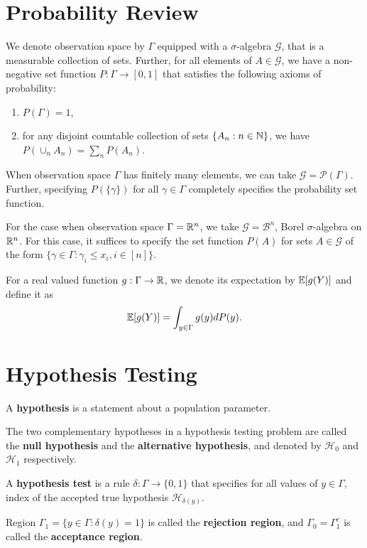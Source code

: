 \documentclass[a4paper,english,12pt]{article}
\begin{document}
\section{Probability Review}
We denote observation space by $\Gamma$ equipped with a $\sigma$-algebra $\mathcal{G}$, that is a  measurable collection of sets.
Further, for all elements of $A \in \mathcal{G}$, we have a non-negative set function $P: \Gamma \to [0,1]$ that satisfies the following axioms of probability:
\begin{enumerate}
\item $P(\Gamma) = 1$,
\item for any disjoint countable collection of sets $\{A_n: n \in \mathbb{N}\}$, we have $P(\cup_nA_n) = \sum_n P(A_n)$.
\end{enumerate}
\begin{exmp} When observation space $\Gamma$ has finitely many elements, we can take $\mathcal{G} = \mathcal{P}(\Gamma)$. 
Further, specifying $P(\{\gamma\})$ for all $\gamma \in \Gamma$ completely specifies the probability set function.
\end{exmp}
\begin{exmp} For the case when observation space $\Gamma = \mathbb{R}^n$, we take $\mathcal{G} = \mathcal{B}^n$, Borel $\sigma$-algebra on $\mathbb{R}^n$. 
For this case, it suffices to specify the set function $P(A)$ for  sets $A \in \mathcal{G}$ of the form $\{\gamma \in \Gamma: \gamma_i \leq x_i, i \in [n]\}$.
\end{exmp}
\begin{defn}[Expectation] For a real valued function $g: \Gamma \to \mathbb{R}$, we denote its expectation by $\mathbb{E}[g(Y)]$ and define it as
\begin{align*}
\mathbb{E}[g(Y)] = \int_{y \in \Gamma}g(y)dP(y).
\end{align*}
\end{defn}

\section{Hypothesis Testing}
\begin{defn} A \textbf{hypothesis} is a statement about a population parameter.
\end{defn}
\begin{defn} The two complementary hypotheses in a hypothesis testing problem are called the \textbf{null hypothesis} and the \textbf{alternative hypothesis}, and denoted by $\mathcal{H}_0$ and $\mathcal{H}_1$ respectively.
\end{defn}
\begin{defn} A \textbf{hypothesis test} is a rule $\delta: \Gamma \to \{0,1\}$ that specifies for all values of $y \in \Gamma$, index of the accepted true hypothesis $\mathcal{H}_{\delta(y)}$. 
\end{defn}
\begin{defn}
Region $\Gamma_1 = \{ y \in \Gamma: \delta(y) = 1 \}$ is called the \textbf{rejection region}, and $\Gamma_0 = \Gamma_1^c$ is called the \textbf{acceptance region}.
\end{defn}
\begin{exmp}
\end{exmp}
\end{document}
